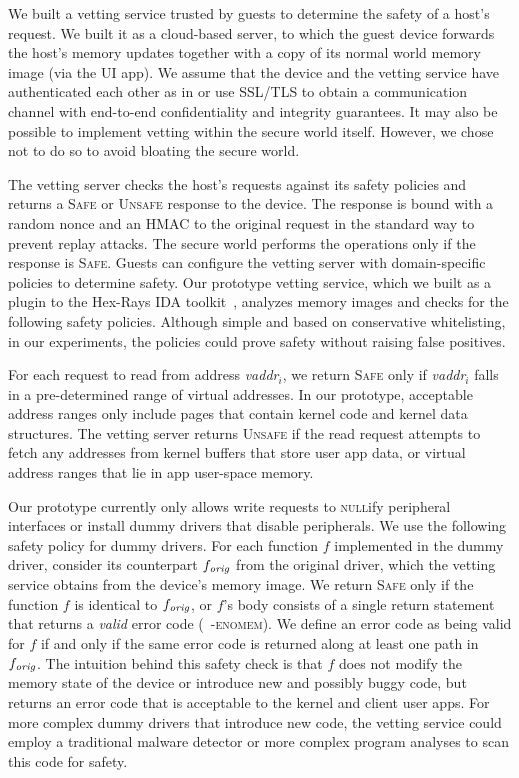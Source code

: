 \label{section:vetting}

We built a vetting service trusted by guests to determine the safety of a
host's request. We built it as a cloud-based server, to which the guest device
forwards the host's memory updates together with a copy of its normal world
memory image (via the UI app). We assume that the device and the vetting
service have authenticated each other as in  or
use SSL/TLS to obtain a communication channel with end-to-end confidentiality
and integrity guarantees. It may also be possible to implement vetting within
the secure world itself. However, we chose not to do so to avoid bloating the
secure world.

The vetting server checks the host's requests against its safety policies and
returns a \textsc{Safe} or \textsc{Unsafe} response to the device. The response
is bound with a random nonce and an HMAC to the original request in the
standard way to prevent replay attacks. The secure world performs the
operations only if the response is \textsc{Safe}. Guests can configure the
vetting server with domain-specific policies to determine safety.  Our
prototype vetting service, which we built as a plugin to the Hex-Rays IDA
toolkit~\cite{ida-pro}, analyzes memory images and checks for the following
safety policies. Although simple and based on conservative whitelisting, in our
experiments, the policies could prove safety without raising false positives.

 For each request to read from address
\textit{vaddr}$_i$, we return \textsc{Safe} only if \textit{vaddr}$_i$ falls in
a pre-determined range of virtual addresses. In our prototype, acceptable
address ranges only include pages that contain kernel code and kernel data
structures.  The vetting server returns \textsc{Unsafe} if the read request
attempts to fetch any addresses from kernel buffers that store user app data,
or virtual address ranges that lie in app user-space memory.

 Our prototype currently only allows write requests
to \textsc{null}ify peripheral interfaces or install dummy drivers that disable
peripherals. We use the following safety policy for dummy drivers.  For each
function $f$ implemented in the dummy driver, consider its counterpart $f_{\it
orig}$ from the original driver, which the vetting service obtains from the
device's memory image. We return \textsc{Safe} only if the function $f$ is
identical to $f_{\it orig}$, or $f$'s body consists of a single return
statement that returns a \textit{valid} error code (\eg~\textsc{-enomem}). We
define an error code as being valid for $f$ if and only if the same error code
is returned along at least one path in $f_{\it orig}$. The intuition behind
this safety check is that $f$ does not modify the memory state of the device or
introduce new and possibly buggy code, but returns an error code that is
acceptable to the kernel and client user apps.  For more complex dummy drivers
that introduce new code, the vetting service could employ a traditional malware
detector or more complex program analyses to scan this code for safety.
